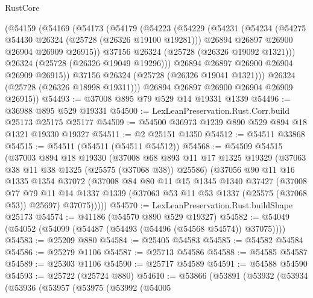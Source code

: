 \begin{lexlean}{RustCore}
\begin{coremodule}
        (@54159
          (@54169
            (@54173
              (@54179
                (@54223
                  (@54229
                    (@54231
                      (@54234
                        (@54275 @54430 @26324 (@25728 (@26326 @19100 @19281)))
                        @26894
                        @26897
                        @26900
                        @26904
                        @26909
                        @26915))
                    @37156
                    @26324
                    (@25728 (@26326 @19092 @1321)))
                  @26324
                  (@25728 (@26326 @19049 @19296)))
                @26894
                @26897
                @26900
                @26904
                @26909
                @26915))
            @37156
            @26324
            (@25728 (@26326 @19041 @1321)))
          @26324
          (@25728 (@26326 @18998 @19311)))
        @26894
        @26897
        @26900
        @26904
        @26909
        @26915))
@54493 := @37008 @895 @79 @529 @14 @19331 @1339
@54496 := @36988 @895 @529 @19331
@54500 := LexLeanPreservation.Rust.Corr.build @25173 @25175 @25177
@54509 := @54500 @36973 @1239 @890 @529 @894 @18 @1321 @19330 @19327
@54511 := @2 @25151 @1350
@54512 := @54511 @33868
@54515 := @54511 (@54511 (@54511 @54512))
@54568 := @54509
    @54515
    (@37003
      @894
      @18
      @19330
      (@37008
        @68
        @893
        @11
        @17
        @1325
        @19329
        (@37063 @38 @11 @38 @1325 (@25575 (@37068 @38)) @25586)
        (@37056
          @90
          @11
          @16
          @1335
          @1354
          @37072
          (@37008
            @84
            @80
            @11
            @15
            @1345
            @1340
            @37427
            (@37008
              @77
              @79
              @11
              @14
              @1337
              @1339
              (@37063 @53 @11 @53 @1337 (@25575 (@37068 @53)) @25697)
              @37075)))))
@54570 := LexLeanPreservation.Rust.buildShape @25173
@54574 := @41186 (@54570 @890 @529 @19327)
@54582 := @54049 (@54052 (@54099 (@54487 (@54493 (@54496 (@54568 @54574)) @37075))))
@54583 := @25209 @880
@54584 := @25405 @54583
@54585 := @54582 @54584
@54586 := @25279 @1106
@54587 := @25713 @54586
@54588 := @54585 @54587
@54589 := @25303 @1106
@54590 := @25717 @54589
@54591 := @54588 @54590
@54593 := @25722 (@25724 @880)
@54610 := @53866
    (@53891
      (@53932
        (@53934
          (@53936
            (@53957
              (@53975
                (@53992
                  (@54005

\end{coremodule}
\end{lexlean}

